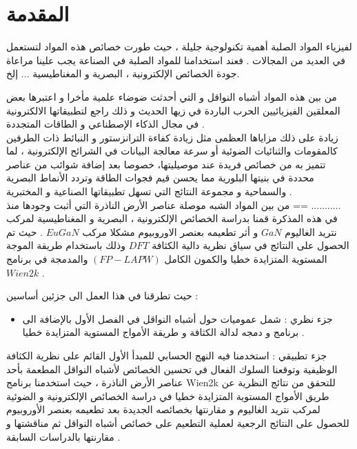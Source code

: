 \chapter*{المقدمة} %

\label{Chapter0} 

\newcommand{\keyword}[1]{\textbf{#1}}
\newcommand{\tabhead}[1]{\textbf{#1}}
\newcommand{\code}[1]{\texttt{#1}}


لفيزياء المواد الصلبة أهمية تكنولوجية جليلة ، حيث طورت خصائص هذه المواد لتستعمل في العديد من المجالات . فعند استخدامنا للمواد الصلبة في الصناعة يجب علينا مراعاة جودة الخصائص الإلكترونية ، البصرية و المغناطيسية ... إلخ.

من بين هذه المواد أشباه النواقل و التي أحدثت ضوضاء علمية مأخرا و اعتبرها بعض المعلقين الفيزيائيين الحرب الباردة في زيها الحديث و ذلك راجع لتطبيقاتها الالكترونية في مجال الذكاء الإصطناعي و الطاقات المتجددة .\\

زيادة على ذلك مزاياها العظمى مثل زيادة كفاءة الترانزستور و النبائط ذات الطرفين كالمقومات والثنائيات الضوئية أو سرعة معالجة البيانات في الشرائح الإلكترونية ، لما تتميز به من خصائص فريدة عند موصيليتها، خصوصا بعد إضافة شوائب من عناصر محددة في بنيتها البلورية مما يحسن قيم فجوات الطاقة وتردد الأنماط البصرية والسماحية و مجموعة النتائج التي تسهل تطبيقاتها الصناعية و المختبرية . \\

من بين المواد الشبه موصلة عناصر الأرض الناذرة التي أثبت وجودها منذ == ...........
\\
في هذه المذكرة قمنا بدراسة الخصائص الإلكترونية ، البصرية و المغناطيسية لمركب نتريد الغاليوم $ GaN $ و أثر تطعيمه بعنصر الاوروبيوم مشكلا مركب $ EuGaN $ . حيث تم الحصول على النتائج في سياق نظرية دالية الكثافة $ DFT $ وذلك باستخدام طريقة الموجة المستوية المتزايدة خطيا والكمون الكامل $ (FP-LAPW) $ والمدمجة في برنامج $ Wien2k $ .

حيث تطرقنا في هذا العمل الى جزئين أساسين :
\begin{itemize}
	\item 
	جزء نظري : شمل عموميات حول أشباه النواقل في الفصل الأول بالإضافة الى برنامج  و دمجه لدالة الكثافة و طريقة الأمواج المستوية المتزايدة خطيا .
\end{itemize}
 جزء تطبيقي : استخدمنا فيه النهج الحسابي للمبدأ الأول القائم على نظرية الكثافة الوظيفية وتوقعنا السلوك الفعال في تحسين الخصائص لأشباه النواقل المطعمة بأحد عناصر الأرض الناذرة ، حيث استخدمنا برنامج Wien2k للتحقق من نتائج النظرية عن طريق الأمواج المستوية المتزايدة خطيا في دراسة الخصائص الإلكترونية و الضوئية لمركب نتريد الغاليوم و مقارنتها بخصائصه الجديدة بعد تطعيمه بعنصر الأوروبيوم للحصول على النتائج الرجعية لعملية التطعيم على خصائص أشباه النواقل ثم مناقشتها و مقارنتها بالدراسات السابقة .



